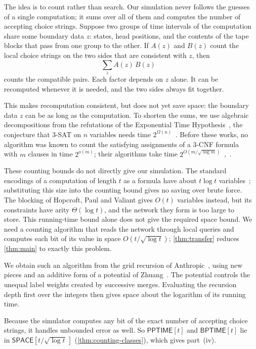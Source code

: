 \documentclass[11pt]{article}
\theoremstyle{definition}
\theoremstyle{definition}
\theoremstyle{remark}
\newcommand{\SPACE}{\mathsf{SPACE}}
\newcommand{\BPTIME}{\mathsf{BPTIME}}
\newcommand{\PPTIME}{\mathsf{PPTIME}}
\begin{document}
The idea is to count rather than search. Our simulation never follows the guesses of a single computation; it sums over all of them and computes the number of accepting choice strings. Suppose two groups of time intervals of the computation share some boundary data $z$: states, head positions, and the contents of the tape blocks that pass from one group to the other. If $A(z)$ and $B(z)$ count the local choice strings on the two sides that are consistent with $z$, then
\[
\sum_zA(z)\,B(z)
\]
counts the compatible pairs. Each factor depends on $z$ alone. It can be recomputed whenever it is needed, and the two sides always fit together.

This makes recomputation consistent, but does not yet save space: the boundary data $z$ can be as long as the computation. To shorten the sums, we use algebraic decompositions from the refutations of the Exponential Time Hypothesis~\cite{Ope26,Ant26}, the conjecture that $3$-SAT on $n$ variables needs time $2^{\Omega(n)}$~\cite{IP01}. Before these works, no algorithm was known to count the satisfying assignments of a $3$-CNF formula with $m$ clauses in time $2^{o(m)}$; their algorithms take time $2^{O(m/\sqrt{\log m})}$~\cite[App.~D.2]{Ope26},~\cite[Main Theorem]{Ant26}.

These counting bounds do not directly give our simulation. The standard encodings of a computation of length $t$ as a formula have about $t\log t$ variables~\cite{PF79,Coo88}; substituting this size into the counting bound gives no saving over brute force. The blocking of Hopcroft, Paul and Valiant gives $O(t)$ variables instead, but its constraints have arity $\Theta(\log t)$, and the network they form is too large to store. This running-time bound alone does not give the required space bound. We need a counting algorithm that reads the network through local queries and computes each bit of its value in space $O(t/\sqrt{\log t})$; \cref{thm:transfer} reduces \cref{thm:main} to exactly this problem.

We obtain such an algorithm from the grid recursion of Anthropic~\cite{Ant26}, using new pieces and an additive form of a potential of Zhuang~\cite{Zhu26}. The potential controls the unequal label weights created by successive merges. Evaluating the recursion depth first over the integers then gives space about the logarithm of its running time.

Because the simulator computes any bit of the exact number of accepting choice strings, it handles unbounded error as well. So $\PPTIME[t]$ and $\BPTIME[t]$ lie in $\SPACE[t/\sqrt{\log t}\,]$ (\cref{thm:counting-classes}), which gives part~(iv).
\end{document}
